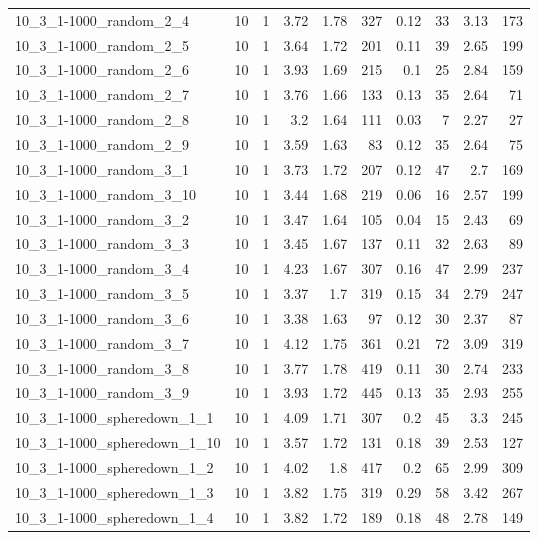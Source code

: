 \begin{center}
\begin{scriptsize}
\begin{longtable}{lrrrrrrrrr}
10\_3\_1-1000\_random\_2\_4 & 10 & 1 & 3.72 & 1.78 & 327 & 0.12 & 33 & 3.13 & 173\\
10\_3\_1-1000\_random\_2\_5 & 10 & 1 & 3.64 & 1.72 & 201 & 0.11 & 39 & 2.65 & 199\\
10\_3\_1-1000\_random\_2\_6 & 10 & 1 & 3.93 & 1.69 & 215 & 0.1 & 25 & 2.84 & 159\\
10\_3\_1-1000\_random\_2\_7 & 10 & 1 & 3.76 & 1.66 & 133 & 0.13 & 35 & 2.64 & 71\\
10\_3\_1-1000\_random\_2\_8 & 10 & 1 & 3.2 & 1.64 & 111 & 0.03 & 7 & 2.27 & 27\\
10\_3\_1-1000\_random\_2\_9 & 10 & 1 & 3.59 & 1.63 & 83 & 0.12 & 35 & 2.64 & 75\\
10\_3\_1-1000\_random\_3\_1 & 10 & 1 & 3.73 & 1.72 & 207 & 0.12 & 47 & 2.7 & 169\\
10\_3\_1-1000\_random\_3\_10 & 10 & 1 & 3.44 & 1.68 & 219 & 0.06 & 16 & 2.57 & 199\\
10\_3\_1-1000\_random\_3\_2 & 10 & 1 & 3.47 & 1.64 & 105 & 0.04 & 15 & 2.43 & 69\\
10\_3\_1-1000\_random\_3\_3 & 10 & 1 & 3.45 & 1.67 & 137 & 0.11 & 32 & 2.63 & 89\\
10\_3\_1-1000\_random\_3\_4 & 10 & 1 & 4.23 & 1.67 & 307 & 0.16 & 47 & 2.99 & 237\\
10\_3\_1-1000\_random\_3\_5 & 10 & 1 & 3.37 & 1.7 & 319 & 0.15 & 34 & 2.79 & 247\\
10\_3\_1-1000\_random\_3\_6 & 10 & 1 & 3.38 & 1.63 & 97 & 0.12 & 30 & 2.37 & 87\\
10\_3\_1-1000\_random\_3\_7 & 10 & 1 & 4.12 & 1.75 & 361 & 0.21 & 72 & 3.09 & 319\\
10\_3\_1-1000\_random\_3\_8 & 10 & 1 & 3.77 & 1.78 & 419 & 0.11 & 30 & 2.74 & 233\\
10\_3\_1-1000\_random\_3\_9 & 10 & 1 & 3.93 & 1.72 & 445 & 0.13 & 35 & 2.93 & 255\\
10\_3\_1-1000\_spheredown\_1\_1 & 10 & 1 & 4.09 & 1.71 & 307 & 0.2 & 45 & 3.3 & 245\\
10\_3\_1-1000\_spheredown\_1\_10 & 10 & 1 & 3.57 & 1.72 & 131 & 0.18 & 39 & 2.53 & 127\\
10\_3\_1-1000\_spheredown\_1\_2 & 10 & 1 & 4.02 & 1.8 & 417 & 0.2 & 65 & 2.99 & 309\\
10\_3\_1-1000\_spheredown\_1\_3 & 10 & 1 & 3.82 & 1.75 & 319 & 0.29 & 58 & 3.42 & 267\\
10\_3\_1-1000\_spheredown\_1\_4 & 10 & 1 & 3.82 & 1.72 & 189 & 0.18 & 48 & 2.78 & 149\\

\end{longtable}
\end{scriptsize}
\end{center}
